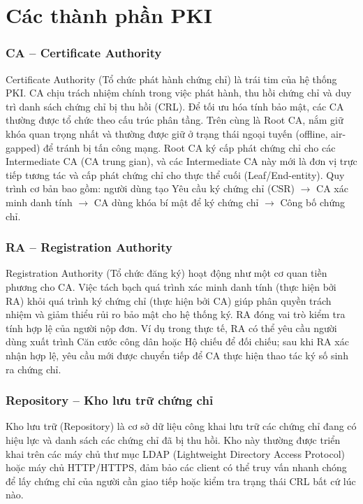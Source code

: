 \section{Các thành phần PKI}
\label{sec:3.3}

\subsubsection*{CA -- Certificate Authority}
Certificate Authority (Tổ chức phát hành chứng chỉ) là trái tim của hệ thống PKI. CA chịu trách nhiệm chính trong việc phát hành, thu hồi chứng chỉ và duy trì danh sách chứng chỉ bị thu hồi (CRL). Để tối ưu hóa tính bảo mật, các CA thường được tổ chức theo cấu trúc phân tầng. Trên cùng là Root CA, nắm giữ khóa quan trọng nhất và thường được giữ ở trạng thái ngoại tuyến (offline, air-gapped) để tránh bị tấn công mạng. Root CA ký cấp phát chứng chỉ cho các Intermediate CA (CA trung gian), và các Intermediate CA này mới là đơn vị trực tiếp tương tác và cấp phát chứng chỉ cho thực thể cuối (Leaf/End-entity). Quy trình cơ bản bao gồm: người dùng tạo Yêu cầu ký chứng chỉ (CSR) $\rightarrow$ CA xác minh danh tính $\rightarrow$ CA dùng khóa bí mật để ký chứng chỉ $\rightarrow$ Công bố chứng chỉ.

\subsubsection*{RA -- Registration Authority}
Registration Authority (Tổ chức đăng ký) hoạt động như một cơ quan tiền phương cho CA. Việc tách bạch quá trình xác minh danh tính (thực hiện bởi RA) khỏi quá trình ký chứng chỉ (thực hiện bởi CA) giúp phân quyền trách nhiệm và giảm thiểu rủi ro bảo mật cho hệ thống ký. RA đóng vai trò kiểm tra tính hợp lệ của người nộp đơn. Ví dụ trong thực tế, RA có thể yêu cầu người dùng xuất trình Căn cước công dân hoặc Hộ chiếu để đối chiếu; sau khi RA xác nhận hợp lệ, yêu cầu mới được chuyển tiếp để CA thực hiện thao tác ký số sinh ra chứng chỉ.

\subsubsection*{Repository -- Kho lưu trữ chứng chỉ}
Kho lưu trữ (Repository) là cơ sở dữ liệu công khai lưu trữ các chứng chỉ đang có hiệu lực và danh sách các chứng chỉ đã bị thu hồi. Kho này thường được triển khai trên các máy chủ thư mục LDAP (Lightweight Directory Access Protocol) hoặc máy chủ HTTP/HTTPS, đảm bảo các client có thể truy vấn nhanh chóng để lấy chứng chỉ của người cần giao tiếp hoặc kiểm tra trạng thái CRL bất cứ lúc nào.

